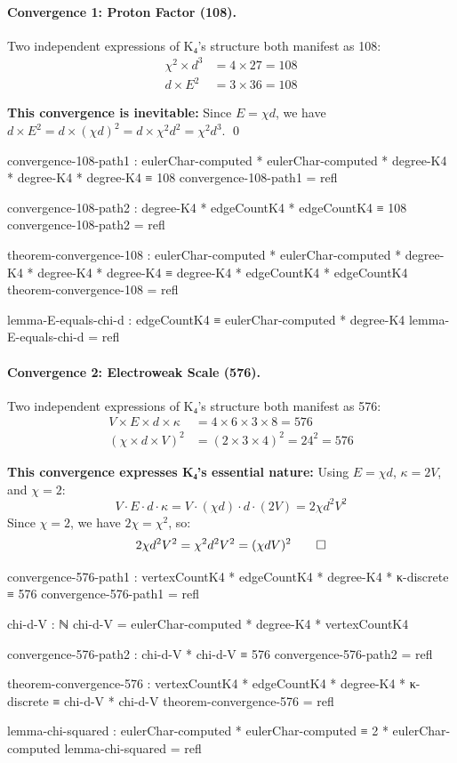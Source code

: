 \documentclass[11pt,a4paper]{book}
\begin{document}
\paragraph{Convergence 1: Proton Factor (108).}

Two independent expressions of K₄'s structure both manifest as 108:
\begin{align}
\chi^2 \times d^3 &= 4 \times 27 = 108 \\
d \times E^2 &= 3 \times 36 = 108
\end{align}

\textbf{This convergence is inevitable:} Since $E = \chi d$, we have $d \times E^2 = d \times (\chi d)^2 = d \times \chi^2 d^2 = \chi^2 d^3$. \qed

\begin{code}
convergence-108-path1 : eulerChar-computed * eulerChar-computed * degree-K4 * degree-K4 * degree-K4 ≡ 108
convergence-108-path1 = refl

convergence-108-path2 : degree-K4 * edgeCountK4 * edgeCountK4 ≡ 108
convergence-108-path2 = refl

theorem-convergence-108 : eulerChar-computed * eulerChar-computed * degree-K4 * degree-K4 * degree-K4 
                        ≡ degree-K4 * edgeCountK4 * edgeCountK4
theorem-convergence-108 = refl

lemma-E-equals-chi-d : edgeCountK4 ≡ eulerChar-computed * degree-K4
lemma-E-equals-chi-d = refl
\end{code}

\paragraph{Convergence 2: Electroweak Scale (576).}

Two independent expressions of K₄'s structure both manifest as 576:
\begin{align}
V \times E \times d \times \kappa &= 4 \times 6 \times 3 \times 8 = 576 \\
(\chi \times d \times V)^2 &= (2 \times 3 \times 4)^2 = 24^2 = 576
\end{align}

\textbf{This convergence expresses K₄'s essential nature:} Using $E = \chi d$, $\kappa = 2V$, and $\chi = 2$:
\[
V \cdot E \cdot d \cdot \kappa = V \cdot (\chi d) \cdot d \cdot (2V) = 2\chi d^2 V^2
\]
Since $\chi = 2$, we have $2\chi = \chi^2$, so:
\[
2\chi d^2 V^2 = \chi^2 d^2 V^2 = (\chi d V)^2 \qed
\]

\begin{code}
convergence-576-path1 : vertexCountK4 * edgeCountK4 * degree-K4 * κ-discrete ≡ 576
convergence-576-path1 = refl

chi-d-V : ℕ
chi-d-V = eulerChar-computed * degree-K4 * vertexCountK4

convergence-576-path2 : chi-d-V * chi-d-V ≡ 576
convergence-576-path2 = refl

theorem-convergence-576 : vertexCountK4 * edgeCountK4 * degree-K4 * κ-discrete 
                        ≡ chi-d-V * chi-d-V
theorem-convergence-576 = refl

lemma-chi-squared : eulerChar-computed * eulerChar-computed ≡ 2 * eulerChar-computed
lemma-chi-squared = refl
\end{code}
\end{document}
